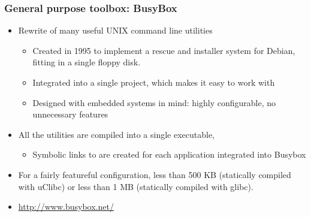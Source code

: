 \begin{frame}
  \frametitle{General purpose toolbox: BusyBox}
  \begin{itemize}
  \item Rewrite of many useful UNIX command line utilities
    \begin{itemize}
    \item Created in 1995 to implement a rescue and installer
     system for Debian, fitting in a single floppy disk.
    \item Integrated into a single project, which makes it easy to
      work with
    \item Designed with embedded systems in mind: highly configurable,
      no unnecessary features
    \end{itemize}
  \item All the utilities are compiled into a single executable,
    \begin{itemize}
    \item Symbolic links to  are created for each
      application integrated into Busybox
    \end{itemize}
  \item For a fairly featureful configuration, less than 500 KB
    (statically compiled with uClibc) or less than 1 MB (statically
    compiled with glibc).
  \item   \url{http://www.busybox.net/}
  \end{itemize}
\end{frame}

